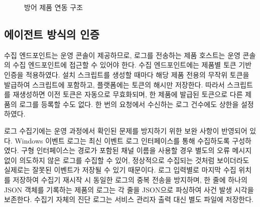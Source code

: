 \begin{figure}[H]
\centering
{}
\caption{방어 제품 연동 구조}
\label{fig:integ}
\end{figure}

\subsection{에이전트 방식의 인증}\label{subsec:integ-token}

수집 엔드포인트는 운영 콘솔이 제공하므로, 로그를 전송하는 제품 호스트는 운영 콘솔의 수집 엔드포인트에 접근할 수 있어야 한다.
수집 엔드포인트에는 제품별 토큰 기반 인증을 적용하였다.
설치 스크립트를 생성할 때마다 해당 제품 전용의 무작위 토큰을 발급하여 스크립트에 포함하고, 플랫폼에는 토큰의 해시만 저장한다.
따라서 스크립트를 재생성하면 이전 토큰은 자동으로 무효화되며, 한 제품에 발급된 토큰으로 다른 제품의 로그를 등록할 수도 없다.
한 번의 요청에서 수신하는 로그 건수에도 상한을 설정하였다.

로그 수집기에는 운영 과정에서 확인된 문제를 방지하기 위한 보완 사항이 반영되어 있다.
Windows 이벤트 로그는 최신 이벤트 로그 인터페이스를 통해 수집하도록 구성하였다. 구형 인터페이스는 경로가 포함된 채널 이름을 사용할 경우 별도의 오류 메시지 없이 의도하지 않은 로그를 수집할 수 있어, 정상적으로 수집되는 것처럼 보이더라도 실제로는 잘못된 이벤트가 저장될 수 있기 때문이다.
로그 입력별로 마지막 수집 위치를 저장하여 수집기 재시작 시 동일한 로그의 중복 전송을 방지하며, 한 줄에 하나의 JSON 객체를 기록하는 제품의 로그는 각 줄을 JSON으로 파싱하여 사건 발생 시각을 보존한다.
수집기 자체의 진단 로그는 서비스 관리자 출력 대신 별도 파일에 저장한다.

